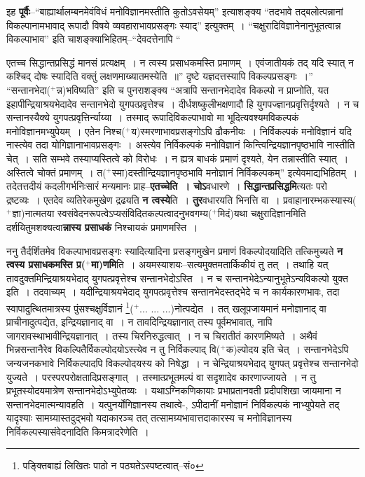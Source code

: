 \documentclass[article,12pt,a4paper]{memoir}
\newcommand{\add}[1]{($^{+}$#1)}
\begin{document}
	  \pstart इह \textbf{पूर्वैः}--“बाह्यार्थालम्बनमेवंविधं मनोविज्ञानमस्तीति कुतोऽवसेयम्” इत्याशङ्क्य “तदभावे तद्बलोत्पन्नानां विकल्पानामभावाद् रूपादौ विषये व्यवहाराभावप्रसङ्गः स्याद्” इत्युक्तम् । “चक्षुरादिविज्ञानेनानुभूतत्वान्न विकल्पाभाव” इति चाशङ्क्याभिहितम्--“देवदत्तेनापि  \leavevmode{} “
	  
	एतच्च सिद्धान्तप्रसिद्धं मानसं प्रत्यक्षम् । न त्वस्य प्रसाधकमस्ति प्रमाणम् । एवंजातीयकं तद् यदि स्यात् न कश्चिद् दोषः स्यादिति वक्तुं लक्षणमाख्यातमस्येति ॥” दृष्टे यज्ञदत्तस्यापि विकल्पप्रसङ्गः ।” “सन्तानभेदा\add{न्न}भविष्यति” इति च पुनराशङ्क्य “अत्रापि सन्तानभेदादेव विकल्पो न प्राप्नोति, यत इहापीन्द्रियाश्रयभेदादेव सन्तानभेदो युगपत्प्रवृत्तेश्च । दीर्धशष्कुलीभक्षणादौ हि युगपज्ज्ञानप्रवृत्तिर्दृश्यते । न च सन्तानस्यैक्ये युगपत्प्रवृत्तिर्न्याय्या । तस्माद् रूपादिविकल्पाभावो मा भूदित्यवश्यमविकल्पकं मनोविज्ञानमभ्युपेयम् । एतेन निश्च\add{य}स्मरणाभावप्रसङ्गोऽपि ढौकनीयः । निर्विकल्पकं मनोविज्ञानं यदि नास्त्येव तदा योगिज्ञानाभावप्रसङ्गः । अस्त्येव निर्विकल्पकं मनोविज्ञानं किन्त्विन्द्रियज्ञानपृष्ठभावि नास्तीति चेत् । सति सम्भवे तस्याप्यस्तित्वे को विरोधः । न ह्यत्र बाधकं प्रमाणं दृश्यते, येन तन्नास्तीति स्यात् । अस्तित्वे चोक्तं प्रमाणम् । त\add{स्मा}दस्तीन्द्रियज्ञानपृष्ठभावि मनोज्ञानं निर्विकल्पकम्” इत्येवमाद्यभिहितम् । तदेतत्तदीयं कदलीगर्भनिःसारं मन्यमानः प्राह--\textbf{एतच्चेति । चोऽ}वधारणे । \textbf{सिद्धान्तप्रसिद्धमि}त्यतः परो द्रष्टव्यः । एतदेव व्यतिरेकमुखेण द्रढयति \textbf{न त्वस्ये}ति । \textbf{तुर}वधारयति भिनत्ति वा । प्रवाहानारम्भकस्यास्य\add{ज्ञा}नात्मतया स्वसंवेदनरूपत्वेऽप्यसंविदितकल्पत्वादनुभवगम्य\add{मिदं}यथा चक्षुरादिज्ञानमिति दर्शयितुमशक्यत्वा\textbf{न्नास्य प्रसाधकं} निश्चायकं प्रमाणमस्ति ।
	\pend
      

	  \pstart ननु तैर्दर्शितमेव विकल्पाभावप्रसङ्गः स्यादित्यादिना प्रसङ्गमुखेन प्रमाणं विकल्पोदयादिति तत्किमुच्यते \textbf{न त्वस्य प्रसाधकमस्ति प्र\add{मा}णमि}ति । अयमस्याशयः--सत्यमुक्तमतार्किकीयं तु तत् । तथाहि यत् तावदुक्तमिन्द्रियाश्रयभेदाद् युगपत्प्रवृत्तेश्च सन्तानभेदोऽस्ति । न च सन्तानभेदेऽन्यानुभूतेऽन्यविकल्पो युक्त इति । तदवाच्यम् । यदीन्द्रियाश्रयभेदाद् युगपत्प्रवृत्तेश्च सन्तानभेदस्तद्भेदे च न कार्यकारणभावः, तदा स्वापादुत्थितमात्रस्य पुंसश्चक्षुर्विज्ञानं \footnote{पङ्क्तिबाह्यं लिखितः पाठो न पठ्यतेऽस्पष्टत्वात्--सं०}\add{... ... ...}नोत्पद्येत । तत् खलूपजायमानं मनोज्ञानाद् वा प्राचीनादुत्पद्येत, इन्द्रियज्ञानाद् वा । न तावदिन्द्रियज्ञानात् तस्य पूर्वमभावात्, नापि जागरावस्थाभावीन्द्रियज्ञानात् । तस्य चिरनिरुद्धत्वात् । न च चिरातीतं कारणमिष्यते । अथैवं भिन्नसन्तानैरेव विकल्पितैर्विकल्पोदयोऽस्त्येव न तु निर्विकल्पाद् वि\add{क}ल्पोदय इति चेत् । सन्तानभेदेऽपि जन्यजनकभावे निर्विकल्पादपि विकल्पोदयस्य को निषेद्धा । न चेन्द्रियाश्रयभेदाद् युगपत् प्रवृत्तेश्च सन्तानभेदो युज्यते । परस्परपरोक्षतादिप्रसङ्गात् । तस्मात्प्रभूतमल्पं वा सदृशादेव कारणाज्जायते । न तु प्रभूतस्योदयमात्रेण सन्तानभेदोऽभ्युपेतव्यः । यथाऽग्निकणिकायाः \leavevmode{}प्रभाप्रतानवती प्रदीपशिखा जायमाना न सन्तानभेदमात्मन्यावहति । यत्पुनर्योगिज्ञानस्य तथात्वे-, ऽपीदानीं मनोज्ञानं निर्विकल्पकं नाभ्युपेयते तद् यादृश्याः सामग्र्यास्तदुद्भवो यदाकारञ्च तत् तत्सामग्र्यभावात्तदाकारस्य च मनोविज्ञानस्य निर्विकल्पस्यासंवेदनादिति किमत्रादरेणेति ।
	\pend
      
\end{document}
